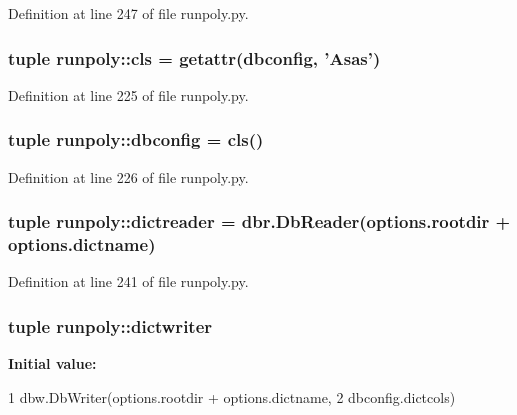 Definition at line 247 of file runpoly.py.

\hypertarget{namespacerunpoly_ae53c9938e3373cc687af5896e211fcc4}{
\subsubsection[{cls}]{\setlength{\rightskip}{0pt plus 5cm}tuple {\bf runpoly::cls} = getattr({\bf dbconfig}, 'Asas')}}
\label{namespacerunpoly_ae53c9938e3373cc687af5896e211fcc4}


Definition at line 225 of file runpoly.py.

\hypertarget{namespacerunpoly_a23238d44f53fedb2335ddfd9e0ba563a}{
\subsubsection[{dbconfig}]{\setlength{\rightskip}{0pt plus 5cm}tuple {\bf runpoly::dbconfig} = {\bf cls}()}}
\label{namespacerunpoly_a23238d44f53fedb2335ddfd9e0ba563a}


Definition at line 226 of file runpoly.py.

\hypertarget{namespacerunpoly_a41be213241b93ac1aaaf0a0dcd1818f2}{
\subsubsection[{dictreader}]{\setlength{\rightskip}{0pt plus 5cm}tuple {\bf runpoly::dictreader} = dbr.DbReader(options.rootdir + options.dictname)}}
\label{namespacerunpoly_a41be213241b93ac1aaaf0a0dcd1818f2}


Definition at line 241 of file runpoly.py.

\hypertarget{namespacerunpoly_a09493fdc135109309376e8ac388a3fde}{
\subsubsection[{dictwriter}]{\setlength{\rightskip}{0pt plus 5cm}tuple {\bf runpoly::dictwriter}}}
\label{namespacerunpoly_a09493fdc135109309376e8ac388a3fde}
{\bfseries Initial value:}
\begin{DoxyCode}
1 dbw.DbWriter(options.rootdir + options.dictname, 
2                               dbconfig.dictcols)
\end{DoxyCode}


